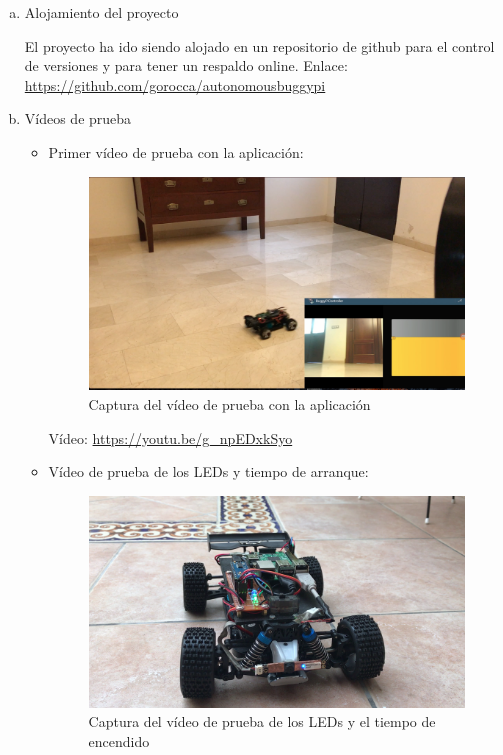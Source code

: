 \documentclass{pclass}
\begin{document}
	
	
	 
	







\begin{enumerate}[a)]
	\item Alojamiento del proyecto
	
		El proyecto ha ido siendo alojado en un repositorio de github para el control de versiones y para tener un respaldo online. Enlace: \url{https://github.com/gorocca/autonomousbuggypi}
	
	\item Vídeos de prueba
		\begin{itemize}
			\item Primer vídeo de prueba con la aplicación:
				\begin{figure}[H]
					\centering
					\includegraphics[width=1\textwidth]{img/capturaPrimerVideoApp}
					\caption{Captura del vídeo de prueba con la aplicación}
					\label{fig:capturaPrimerVideoApp}
				\end{figure}
		
				 Vídeo: \url{https://youtu.be/g_npEDxkSyo}
				 
				
				\item Vídeo de prueba de los LEDs y tiempo de arranque:
				
				\begin{figure}[H]
					\centering
					\includegraphics[width=1\textwidth]{img/testLeds}
					\caption{Captura del vídeo de prueba de los LEDs y el tiempo de encendido}
					\label{fig:capturaLeds}
				\end{figure}
				

\end{itemize}
\end{enumerate}
\end{document}
